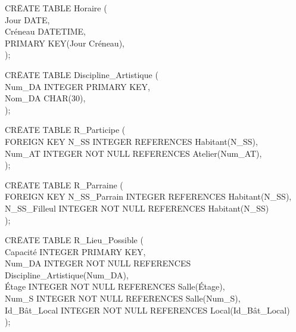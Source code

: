 \documentclass[a4paper,10.5pt]{report}
\begin{document}
		\begin{tabbing}
			CR\=EATE TABLE Horaire (\\
			\> Jour DATE,\\
			\> Créneau DATETIME,\\
			\> PRIMARY KEY(Jour Créneau),\\);
		\end{tabbing}
		\begin{tabbing}
			CR\=EATE TABLE Discipline\_Artistique (\\
			\> Num\_DA INTEGER PRIMARY KEY,\\
			\> Nom\_DA CHAR(30),\\);
		\end{tabbing}
		\begin{tabbing}
			CR\=EATE TABLE R\_Participe (\\
			\> FOREIGN KEY N\_SS INTEGER REFERENCES Habitant(N\_SS),\\
			\> Num\_AT INTEGER NOT NULL REFERENCES Atelier(Num\_AT),\\);
		\end{tabbing}
		\begin{tabbing}
			CR\=EATE TABLE R\_Parraine (\\
			\> FOREIGN KEY N\_SS\_Parrain INTEGER REFERENCES Habitant(N\_SS),\\
			\> N\_SS\_Filleul INTEGER NOT NULL REFERENCES Habitant(N\_SS)\\);
		\end{tabbing}
		\begin{tabbing}
			CR\=EATE TABLE R\_Lieu\_Possible (\\
			\> Capacité INTEGER PRIMARY KEY,\\
			\> Num\_DA INTEGER NOT NULL REFERENCES Discipline\_Artistique(Num\_DA),\\
			\> Étage INTEGER NOT NULL REFERENCES Salle(Étage),\\
			\> Num\_S INTEGER NOT NULL REFERENCES Salle(Num\_S),\\
			\> Id\_Bât\_Local INTEGER NOT NULL REFERENCES Local(Id\_Bât\_Local)\\);
		\end{tabbing}
\end{document}
